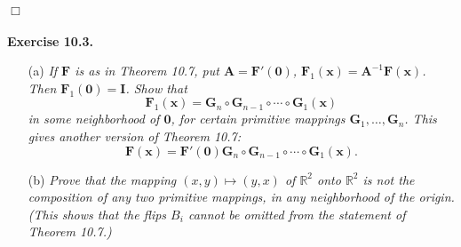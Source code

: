 \documentclass{article}
\begin{document}
$\Box$ \\\\






\textbf{Exercise 10.3.}
\begin{enumerate}
\item[(a)]
  \emph{If $\mathbf{F}$ is as in Theorem 10.7,
  put $\mathbf{A} = \mathbf{F}'(\mathbf{0})$,
  $\mathbf{F}_1(\mathbf{x}) = \mathbf{A}^{-1} \mathbf{F}(\mathbf{x})$.
  Then $\mathbf{F}_1(\mathbf{0}) = \mathbf{I}$.
  Show that
  \[
    \mathbf{F}_1(\mathbf{x})
    = \mathbf{G}_{n} \circ \mathbf{G}_{n-1} \circ \cdots \circ \mathbf{G}_1(\mathbf{x})
  \]
  in some neighborhood of $\mathbf{0}$,
  for certain primitive mappings $\mathbf{G}_{1}, \ldots, \mathbf{G}_{n}$.
  This gives another version of Theorem 10.7:}
  \[
    \mathbf{F}(\mathbf{x})
    =
    \mathbf{F}'(\mathbf{0})
    \mathbf{G}_{n} \circ \mathbf{G}_{n-1} \circ \cdots \circ \mathbf{G}_1(\mathbf{x}).
  \]

\item[(b)]
  \emph{Prove that the mapping $(x,y) \mapsto (y,x)$ of $\mathbb{R}^2$ onto $\mathbb{R}^2$
  is not the composition of any two primitive mappings,
  in any neighborhood of the origin.
  (This shows that the flips $B_i$ cannot be omitted from the statement of Theorem 10.7.)} \\
\end{enumerate}
\end{document}
